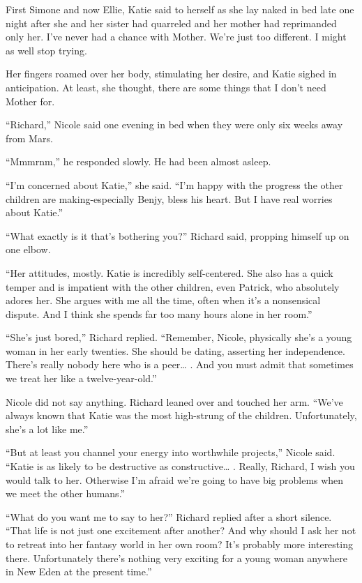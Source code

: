 \documentclass[]{article}
\begin{document}
{First Simone and now Ellie, Katie said to herself as she lay naked in bed late one night after she and her sister had quarreled and her mother had reprimanded only her. I’ve never had a chance with Mother. We’re just too different. I might as well stop trying.

Her fingers roamed over her body, stimulating her desire, and Katie sighed in anticipation. At least, she thought, there are some things that I don’t need Mother for.

“Richard,” Nicole said one evening in bed when they were only six weeks away from Mars.

“Mmmrnm,” he responded slowly. He had been almost asleep.

“I’m concerned about Katie,” she said. “I’m happy with the progress the other children are making-especially Benjy, bless his heart. But I have real worries about Katie.”

“What exactly is it that’s bothering you?” Richard said, propping himself up on one elbow.

“Her attitudes, mostly. Katie is incredibly self-centered. She also has a quick temper and is impatient with the other children, even Patrick, who absolutely adores her. She argues with me all the time, often when it’s a nonsensical dispute. And I think she spends far too many hours alone in her room.”

“She’s just bored,” Richard replied. “Remember, Nicole, physically she’s a young woman in her early twenties. She should be dating, asserting her independence. There’s really nobody here who is a peer… . And you must admit that sometimes we treat her like a twelve-year-old.”

Nicole did not say anything. Richard leaned over and touched her arm. “We’ve always known that Katie was the most high-strung of the children. Unfortunately, she’s a lot like me.”

“But at least you channel your energy into worthwhile projects,” Nicole said. “Katie is as likely to be destructive as constructive… . Really, Richard, I wish you would talk to her. Otherwise I’m afraid we’re going to have big problems when we meet the other humans.”

“What do you want me to say to her?” Richard replied after a short silence. “That life is not just one excitement after another? And why should I ask her not to retreat into her fantasy world in her own room? It’s probably more interesting there. Unfortunately there’s nothing very exciting for a young woman anywhere in New Eden at the present time.”

}
\end{document}
